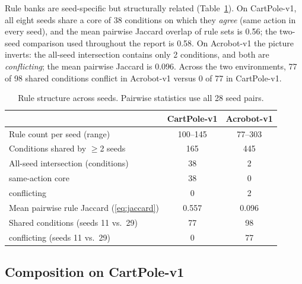 \documentclass[11pt]{article}
\begin{document}
Rule banks are seed-specific but structurally related (Table~\ref{tab:structure}). On CartPole-v1,
all eight seeds share a core of 38 conditions on which they \emph{agree} (same action in every
seed), and the mean pairwise Jaccard overlap of rule sets is 0.56; the two-seed comparison used
throughout the report is 0.58. On Acrobot-v1 the picture inverts: the all-seed intersection contains
only 2 conditions, and both are \emph{conflicting}; the mean pairwise Jaccard is 0.096. Across the
two environments, 77 of 98 shared conditions conflict in Acrobot-v1 versus 0 of 77 in CartPole-v1.

\begin{table}[t]
\centering
\caption{Rule structure across seeds. Pairwise statistics use all 28 seed pairs.}
\label{tab:structure}
\begin{tabular}{lcc}
\toprule
 & CartPole-v1 & Acrobot-v1 \\
\midrule
Rule count per seed (range) & 100--145 & 77--303 \\
Conditions shared by $\ge$2 seeds & 165 & 445 \\
All-seed intersection (conditions) & 38 & 2 \\
\quad same-action core & 38 & 0 \\
\quad conflicting & 0 & 2 \\
Mean pairwise rule Jaccard (\ref{eq:jaccard}) & 0.557 & 0.096 \\
Shared conditions (seeds 11 vs.\ 29) & 77 & 98 \\
\quad conflicting (seeds 11 vs.\ 29) & 0 & 77 \\
\bottomrule
\end{tabular}
\end{table}

\subsection{Composition on CartPole-v1}
\label{sec:experiments:cartpole}
\end{document}

